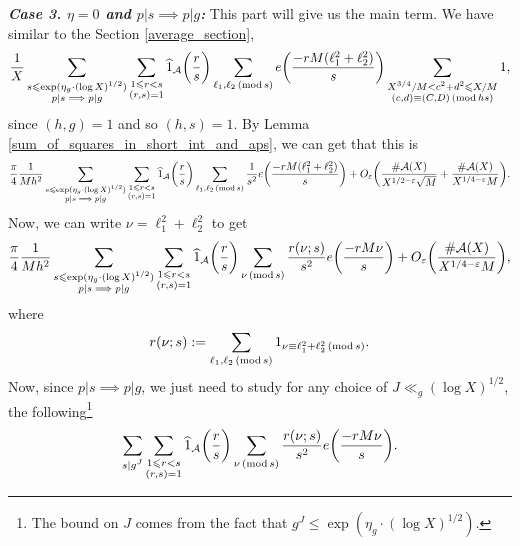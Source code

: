 \documentclass[12pt]{amsart}
\newtheorem{lem}[thm]{Lemma}
\theoremstyle{definition}
\theoremstyle{definition}
\theoremstyle{remark}
\numberwithin{equation}{section}
\newcommand{\CA}{\mathcal{A}}
\renewcommand{\leq}{\leqslant}
\renewcommand{\hat}{\widehat}
\renewcommand{\mod}[1]{\,({\rm mod}\,#1)}
\begin{document}
\noindent \textit{\textbf{Case 3. $\eta=0$ and $p|s \implies p|g$:}} This part will give us the main term. We have similar to the Section \ref{average_section},
$$  \frac{1}{X} \sum_{\substack{s\leq \exp(\eta_g\cdot (\log X)^{1/2}) \\ p|s\implies p|g }}  \sum_{\substack{1\leq r < s \\ (r,s)=1}}\hat{1}_{\CA}\bigg(\frac{r}{s}\bigg) \sum_{\ell_1,\ell_2 \mod s } e\bigg( \frac{-rM(\ell_1^2+\ell_2^2)}{s} \bigg) \sum_{\substack{X^{3/4}/M < c^2+d^2\leq X/M \\ (c,d)\equiv (C,D)\mod{hs}}} 1, $$
since $(h,g)=1$ and so $(h,s)=1$. By Lemma \ref{sum_of_squares_in_short_int_and_aps}, we can get that this is
$$ \frac{\pi}{4}\frac{1}{Mh^2} \sum_{\substack{s\leq \exp(\eta_g\cdot (\log X)^{1/2}) \\ p|s\implies p|g}}  \sum_{\substack{1\leq r < s \\ (r,s)=1}}\hat{1}_{\CA}\bigg(\frac{r}{s}\bigg) \sum_{\ell_1,\ell_2 \mod s}\frac{1}{s^2} e\bigg( \frac{-rM(\ell_1^2+\ell_2^2)}{s} \bigg) + O_{\varepsilon}\bigg( \frac{\#\CA(X)}{X^{1/2-\varepsilon}\sqrt{M}} + \frac{\#\CA(X)}{X^{1/4-\varepsilon} M} \bigg)  . $$
 Now, we can write $\nu=\ell_1^2+\ell_2^2$ to get
$$ \frac{\pi}{4}\frac{1}{Mh^2} \sum_{\substack{s\leq \exp(\eta_g\cdot (\log X)^{1/2}) \\ p|s\implies p|g}} \sum_{\substack{1\leq r < s \\ (r,s)=1}}\hat{1}_{\CA}\bigg(\frac{r}{s}\bigg) \sum_{\nu \mod s}\frac{r(\nu ;s)}{s^2} e\bigg( \frac{-rM\nu}{s} \bigg) + O_{\varepsilon}\bigg( \frac{\#\CA(X)}{X^{1/4-\varepsilon}M} \bigg)  , $$
where
$$ r(\nu ;s) := \sum_{\ell_1, \ell_2 \mod s} 1_{\nu\equiv \ell_1^2+\ell_2^2 \mod s}. $$
Now, since $p|s\implies p|g$, we just need to study for any choice of $J\ll_g (\log X)^{1/2}$, the following\footnote{The bound on $J$ comes from the fact that $g^J\leq \exp(\eta_g \cdot (\log X)^{1/2})$.}
\begin{equation}\label{getting_rid_of_s}
 \sum_{\substack{s|g^J }} \sum_{\substack{1\leq r < s \\ (r,s)=1}}\hat{1}_{\CA}\bigg(\frac{r}{s}\bigg) \sum_{\nu \mod s}\frac{r(\nu ;s)}{s^2} e\bigg( \frac{-rM\nu}{s} \bigg).
\end{equation}
\end{document}
